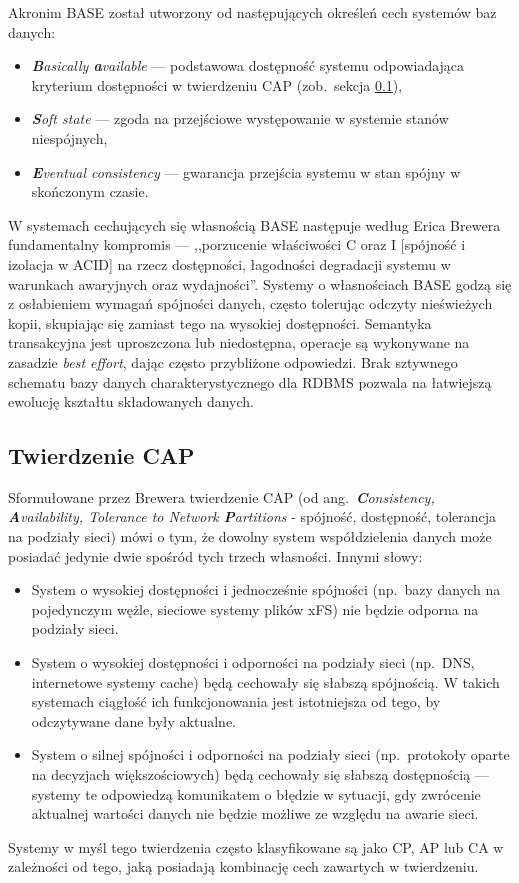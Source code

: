 Akronim BASE został utworzony od następujących określeń cech systemów baz danych:
\begin{itemize}
    \item \textit{\textbf{B}asically \textbf{a}vailable} --- podstawowa dostępność systemu
        odpowiadająca kryterium dostępności w twierdzeniu CAP (zob.\ sekcja \ref{captheorem}),
    \item \textit{\textbf{S}oft state} --- zgoda na przejściowe występowanie w systemie stanów niespójnych,
    \item \textit{\textbf{E}ventual consistency} --- gwarancja przejścia systemu w stan spójny w skończonym czasie.
\end{itemize}
W systemach cechujących się własnością BASE następuje według Erica Brewera fundamentalny kompromis --- ,,porzucenie właściwości C oraz I [spójność i izolacja w ACID] na rzecz dostępności, łagodności degradacji systemu w warunkach awaryjnych oraz wydajności''. Systemy o własnościach BASE godzą się z osłabieniem wymagań spójności danych, często tolerując odczyty nieświeżych kopii, skupiając się zamiast tego na wysokiej dostępności. Semantyka transakcyjna jest uproszczona lub niedostępna, operacje są wykonywane na zasadzie \textit{best effort}, dając często przybliżone odpowiedzi. Brak sztywnego schematu bazy danych charakterystycznego dla RDBMS pozwala na łatwiejszą ewolucję kształtu składowanych danych. \cite{bre00}


\subsection{Twierdzenie CAP} \label{captheorem}

Sformułowane przez Brewera twierdzenie CAP (od ang.\ \textit{\textbf{C}onsistency, \textbf{A}vailability, Tolerance to Network \textbf{P}artitions} - spójność, dostępność, tolerancja na podziały sieci) mówi o tym, że dowolny system współdzielenia danych może posiadać jedynie dwie spośród tych trzech własności. Innymi słowy:
\begin{itemize}
    \item System o wysokiej dostępności i jednocześnie spójności (np.\ bazy danych na pojedynczym wężle, sieciowe systemy plików xFS) nie będzie odporna na podziały sieci.
    \item System o wysokiej dostępności i odporności na podziały sieci (np.\ DNS, internetowe systemy cache) będą cechowały się słabszą spójnością. W takich systemach ciągłość ich funkcjonowania jest istotniejsza od tego, by odczytywane dane były aktualne.
    \item System o silnej spójności i odporności na podziały sieci (np.\ protokoły oparte na decyzjach większościowych) będą cechowały się słabszą dostępnością --- systemy te odpowiedzą komunikatem o błędzie w sytuacji, gdy zwrócenie aktualnej wartości danych nie będzie możliwe ze względu na awarie sieci.
\end{itemize}
Systemy w myśl tego twierdzenia często klasyfikowane są jako CP, AP lub CA w zależności od tego, jaką posiadają kombinację cech zawartych w twierdzeniu.

